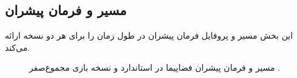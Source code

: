 \subsection{مسیر و فرمان پیشران}
این بخش مسیر و پروفایل فرمان پیشران در طول زمان را برای هر دو نسخه  ارائه می‌کند.
\begin{figure}[H]
	\centering
	
	
	\caption{مسیر و فرمان پیشران فضاپیما در  استاندارد و نسخه بازی مجموع‌صفر
		.}
\end{figure}


